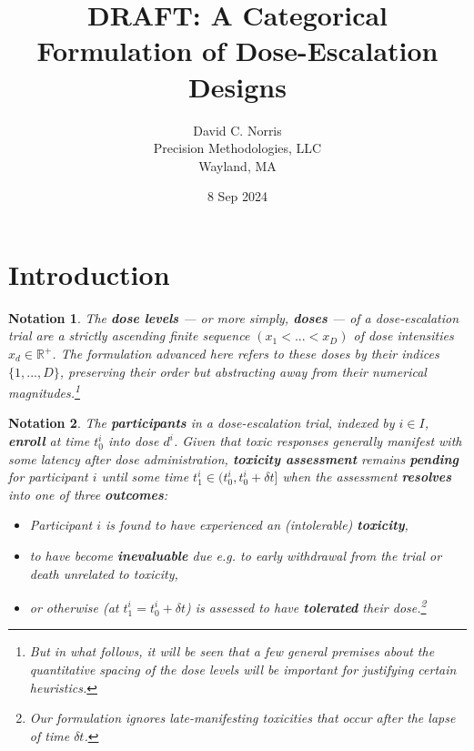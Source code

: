 \documentclass{article}
\newcommand{\R}{\mathbb{R}}
\begin{document}
\newtheorem{thm}{Theorem}[section]
\newtheorem{nota}[thm]{Notation}
\newtheorem{defn}[thm]{Definition}
\newtheorem{fact}[thm]{Fact}
\newtheorem{prop}[thm]{Proposition}
\newtheorem{lemma}[thm]{Lemma}
\newtheorem{corr}[thm]{Corrolary}
\newtheorem{conj}[thm]{Conjecture}
\newtheorem{eg}[thm]{Example}

\title{DRAFT: A Categorical Formulation of Dose-Escalation Designs}
\author{David C. Norris\\Precision Methodologies, LLC\\Wayland, MA}
\date{8 Sep 2024}

\maketitle

\section{Introduction}

\begin{nota}
  The \textbf{dose levels} --- or more simply, \textbf{doses} --- of a dose-escalation trial are a strictly ascending finite sequence $(x_1 < ... < x_D)$ of dose intensities $x_d \in \R^+$.  The formulation advanced here refers to these doses by their indices $\{1,...,D\}$, preserving their order but abstracting away from their numerical magnitudes.\footnote{But in what follows, it will be seen that a few general premises about the quantitative spacing of the dose levels will be important for justifying certain heuristics.}
\end{nota}

\begin{nota}
  The \textbf{participants} in a dose-escalation trial, indexed by $i \in I$, \textbf{enroll} at time $t_0^i$ into dose $d^i$.  Given that toxic responses generally manifest with some latency after dose administration, \textbf{toxicity assessment} remains \textbf{pending} for participant $i$ until some time $t_1^i \in (t_0^i, t_0^i + \delta t]$ when the assessment \textbf{resolves} into one of three \textbf{outcomes}:
  
  \begin{itemize}
    \item Participant $i$ is found to have experienced an (intolerable) \textbf{toxicity},
    \item to have become \textbf{inevaluable} due e.g. to early withdrawal from the trial or death unrelated to toxicity,
  \item or otherwise (at $t_1^i = t_0^i + \delta t$) is assessed to have \textbf{tolerated} their dose.\footnote{Our formulation ignores late-manifesting toxicities that occur after the lapse of time $\delta t$.}
  \end{itemize}
\end{nota}
\end{document}
